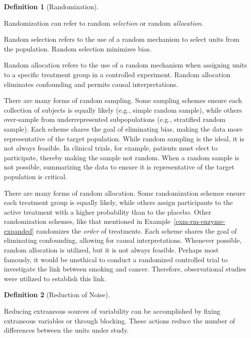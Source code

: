 \documentclass[
  letterpaper,
  DIV=11,
  numbers=noendperiod]{scrreprt}
\theoremstyle{definition}
\theoremstyle{definition}
\newtheorem{definition}{Definition}[chapter]
\theoremstyle{remark}
\begin{document}
\begin{definition}[Randomization]\protect\hypertarget{def-randomization}{}\label{def-randomization}

Randomization can refer to random \emph{selection} or random
\emph{allocation}.

Random selection refers to the use of a random mechanism to select units
from the population. Random selection minimizes bias.

Random allocation refers to the use of a random mechanism when assigning
units to a specific treatment group in a controlled experiment. Random
allocation eliminates confounding and permits causal interpretations.

\end{definition}

There are many forms of random sampling. Some sampling schemes ensure
each collection of subjects is equally likely (e.g., simple random
sample), while others over-sample from underrepresented subpopulations
(e.g., stratified random sample). Each scheme shares the goal of
eliminating bias, making the data more representative of the target
population. While random sampling is the ideal, it is not always
feasible. In clinical trials, for example, patients must elect to
participate, thereby making the sample not random. When a random sample
is not possible, summarizing the data to ensure it is representative of
the target population is critical.

There are many forms of random allocation. Some randomization schemes
ensure each treatment group is equally likely, while others assign
participants to the active treatment with a higher probability than to
the placebo. Other randomization schemes, like that mentioned in
Example~\ref{exm-rm-enzyme-expanded} randomizes the \emph{order} of
treatments. Each scheme shares the goal of eliminating confounding,
allowing for causal interpretations. Whenever possible, random
allocation is utilized, but it is not always feasible. Perhaps most
famously, it would be unethical to conduct a randomized controlled trial
to investigate the link between smoking and cancer. Therefore,
observational studies were utilized to establish this link.

\begin{definition}[Reduction of
Noise]\protect\hypertarget{def-noise-reduction}{}\label{def-noise-reduction}

Reducing extraneous sources of variability can be accomplished by fixing
extraneous variables or through blocking. These actions reduce the
number of differences between the units under study.

\end{definition}
\end{document}
